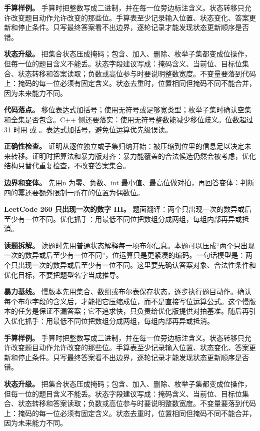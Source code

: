 \textbf{手算样例。} 手算时把整数写成二进制，并在每一位旁边标注含义。状态转移只允许改变题目动作允许改变的那些位。手算表至少记录输入位置、状态变化、答案更新和停止条件。只写最终答案看不出边界，逐轮记录才能发现状态更新顺序是否错。

\textbf{状态升级。} 把集合状态压成掩码；包含、加入、删除、枚举子集都变成位操作，但每一位的题目含义不能丢。状态字段建议写成：掩码含义、当前位、目标位集合、状态转移和答案读取；负数或高位参与时要说明整数宽度。不变量要落到代码上：掩码的每一位必须有固定含义。状态去重时，位置相同但掩码不同不能合并，因为未来能力不同。

\textbf{代码落点。} 移位表达式加括号；使用无符号或足够宽类型；枚举子集时确认空集和全集是否包含。C++ 侧还要落实：使用无符号整数能减少移位歧义。位数超过 31 时用  或 。表达式加括号，避免位运算优先级误读。

\textbf{正确性检查。} 证明从逐位独立或子集归纳开始：被压缩到位里的信息足以决定未来转移。证明时把算法和暴力版对齐：暴力能覆盖的合法候选仍然会被考虑，优化结构只替代重复检查，不改变答案集合。

\textbf{边界和变体。} 先用n 为零、负数、int 最小值、最高位做对拍，再回答变体：判断四的幂还要额外限制一所在的位置为偶数位。

\noindent\textbf{LeetCode 260 只出现一次的数字 III。} 题面翻译：两个只出现一次的数异或后至少有一位不同。优化抓手：用最低不同位把数组分成两组，每组内部再异或抵消。

\textbf{读题拆解。} 读题时先用普通状态解释每一项布尔信息。本题可以压成“两个只出现一次的数异或后至少有一位不同”，位运算只是更紧凑的编码。一句话模型是：两个只出现一次的数异或后至少有一位不同。这里要先确认答案对象、合法性条件和优化目标，不要把题型名字当成推导。

\textbf{暴力基线。} 慢版本先用集合、数组或布尔表保存状态，逐步执行题目动作。确认每个布尔字段的含义后，才能把它压缩成位，而不是直接写位运算公式。这个慢版本的任务是保证不漏答案；它不追求快，只负责给优化版提供对拍基准。随后再引入优化抓手：用最低不同位把数组分成两组，每组内部再异或抵消。

\textbf{手算样例。} 手算时把整数写成二进制，并在每一位旁边标注含义。状态转移只允许改变题目动作允许改变的那些位。手算表至少记录输入位置、状态变化、答案更新和停止条件。只写最终答案看不出边界，逐轮记录才能发现状态更新顺序是否错。

\textbf{状态升级。} 把集合状态压成掩码；包含、加入、删除、枚举子集都变成位操作，但每一位的题目含义不能丢。状态字段建议写成：掩码含义、当前位、目标位集合、状态转移和答案读取；负数或高位参与时要说明整数宽度。不变量要落到代码上：掩码的每一位必须有固定含义。状态去重时，位置相同但掩码不同不能合并，因为未来能力不同。

